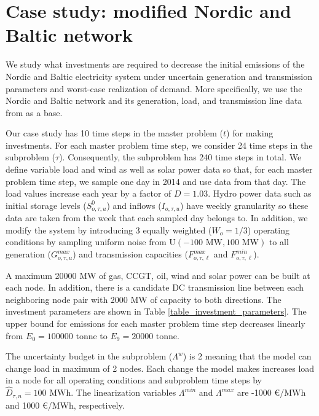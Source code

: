 \documentclass[final]{IEEEtran}
\begin{document}
\section{Case study: modified Nordic and Baltic network}
\label{section_case_study}

We study what investments are required to decrease the initial emissions of the Nordic and Baltic electricity system under uncertain generation and transmission parameters and worst-case realization of demand. More specifically, we use the Nordic and Baltic network and its generation, load, and transmission line data from \cite{Virasjoki} as a base.

Our case study has 10 time steps in the master problem ($t$) for making investments. For each master problem time step, we consider 24 time steps in the subproblem ($\tau$). Consequently, the subproblem has 240 time steps in total. We define variable load and wind as well as solar power data so that, for each master problem time step, we sample one day in 2014 and use data from that day. The load values increase each year by a factor of $D = 1.03$. Hydro power data such as initial storage levels ($S_{o, \tau, u}^0$) and inflows ($I_{o, \tau, u}$) have weekly granularity so these data are taken from the week that each sampled day belongs to. In addition, we modify the system by introducing 3 equally weighted ($W_o = 1/3$) operating conditions by sampling uniform noise from $\textrm{U}(-100 \textrm{ MW}, 100 \textrm{ MW})$ to all generation ($G^{max}_{o, \tau, u}$) and transmission capacities ($F^{max}_{o, \tau, \ell}$ and $F^{min}_{o, \tau, \ell}$).

A maximum 20000 MW of gas, CCGT, oil, wind and solar power can be built at each node. In addition, there is a candidate DC transmission line between each neighboring node pair with 2000 MW of capacity to both directions. The investment parameters are shown in Table \ref{table_investment_parameters}. The upper bound for emissions for each master problem time step decreases linearly from $E_{0} = 100000 \textrm{ tonne}$ to $E_{9} = 20000 \textrm{ tonne}$.

The uncertainty budget in the subproblem ($\Lambda^w$) is 2 meaning that the model can change load in maximum of 2 nodes. Each change the model makes increases load in a node for all operating conditions and subproblem time steps by $\hat{D}_{\tau, n} = 100 \textrm{ MWh}$. The linearization variables $\Lambda^{min}$ and $\Lambda^{max}$ are -1000 €/MWh and 1000 €/MWh, respectively.
\end{document}
